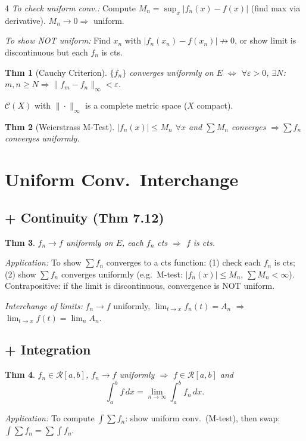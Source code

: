 \documentclass[9pt,landscape]{extarticle}
\newcommand{\eps}{\varepsilon}
\theoremstyle{compact}
\newtheorem*{thm}{Thm}
\theoremstyle{defnstyle}
\begin{document}
\begin{multicols}{4}
\textit{To check uniform conv.:} Compute $M_n = \sup_x|f_n(x)-f(x)|$ (find max via derivative). $M_n \to 0 \Rightarrow$ uniform.

\textit{To show NOT uniform:} Find $x_n$ with $|f_n(x_n)-f(x_n)| \not\to 0$, or show limit is discontinuous but each $f_n$ is cts.

\begin{thm}[Cauchy Criterion]
$\{f_n\}$ converges uniformly on $E$ $\Leftrightarrow$ $\forall \eps > 0$, $\exists N$: $m,n \geq N \Rightarrow \|f_m - f_n\|_\infty < \eps$.
\end{thm}

$\mathscr{C}(X)$ with $\|\cdot\|_\infty$ is a complete metric space ($X$ compact).

\begin{highlight}
\begin{thm}[Weierstrass M-Test]
$|f_n(x)| \leq M_n$ $\forall x$ and $\sum M_n$ converges $\Rightarrow \sum f_n$ converges uniformly.
\end{thm}
\end{highlight}

\section{Uniform Conv.\ Interchange}

\subsection{+ Continuity (Thm 7.12)}
\begin{thm}
$f_n \to f$ uniformly on $E$, each $f_n$ cts $\Rightarrow$ $f$ is cts.
\end{thm}
\textit{Application:} To show $\sum f_n$ converges to a cts function: (1) check each $f_n$ is cts; (2) show $\sum f_n$ converges uniformly (e.g.\ M-test: $|f_n(x)|\leq M_n$, $\sum M_n < \infty$). Contrapositive: if the limit is discontinuous, convergence is NOT uniform.

\textit{Interchange of limits:} $f_n \to f$ uniformly, $\lim_{t\to x} f_n(t) = A_n$ $\Rightarrow$ $\lim_{t\to x} f(t) = \lim_{n} A_n$.

\subsection{+ Integration}
\begin{thm}
$f_n \in \mathscr{R}[a,b]$, $f_n \to f$ uniformly $\Rightarrow$ $f \in \mathscr{R}[a,b]$ and
$$\int_a^b f\,dx = \lim_{n\to\infty}\int_a^b f_n\,dx.$$
\end{thm}
\textit{Application:} To compute $\int \sum f_n$: show uniform conv.\ (M-test), then swap: $\int \sum f_n = \sum \int f_n$.


\end{multicols}
\end{document}
